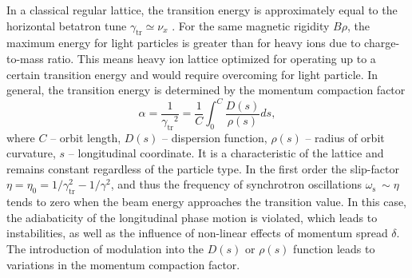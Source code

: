 \documentclass[a4paper,
               keeplastbox,   %
               ]{jacow}
\begin{document}
	In a classical regular lattice, the transition energy is approximately equal to the horizontal betatron tune $\gamma_{\text{tr}}\simeq\nu_{x}$ \cite{b1}. For the same magnetic rigidity $B\rho$, the maximum energy for light particles is greater than for heavy ions due to charge-to-mass ratio. This means heavy ion lattice optimized for operating up to a certain transition energy and would require overcoming for light particle. In general, the transition energy is determined by the momentum compaction factor
\begin{equation}
	\alpha=\frac{1}{{\gamma_{\text{tr}}}^2}=\frac{1}{C}\int_{0}^{C}{\frac{D\left(s\right)}{\rho\left(s\right)}ds},
\end{equation}
	\noindent where $C$ -- orbit length, $D(s)$ -- dispersion function, $\rho(s)$ -- radius of orbit curvature, $s$ -- longitudinal coordinate. It is a characteristic of the lattice and remains constant regardless of the particle type. In the first order the slip-factor $\eta=\eta_0=1/\gamma_{\text{tr}}^2-1/\gamma^2$, and thus the frequency of synchrotron oscillations $\omega_{\text{s}}\ \sim \eta$ tends to zero when the beam energy approaches the transition value. In this case, the adiabaticity of the longitudinal phase motion is violated, which leads to instabilities, as well as the influence of non-linear effects of momentum spread $\delta$. The introduction of modulation into the $D\left(s\right)$ or $\rho\left(s\right)$ function leads to variations in the momentum compaction factor.
\end{document}
